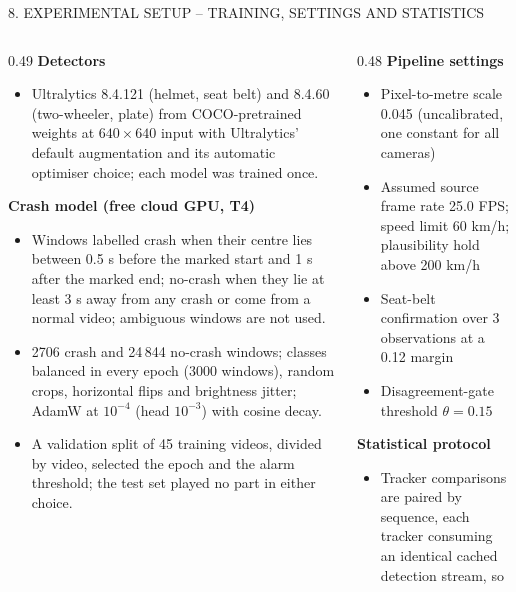 \documentclass[aspectratio=169,10pt,t]{beamer}
\newcommand{\hd}[1]{{\color{dsblue}\textbf{#1}}}          %
\begin{document}
\begin{frame}{8. EXPERIMENTAL SETUP -- TRAINING, SETTINGS AND STATISTICS}
\scriptsize
\begin{columns}[T,onlytextwidth]
\begin{column}{0.49\textwidth}
\hd{\small Detectors}
\begin{itemize}\setlength{\itemsep}{0.15em}
  \item Ultralytics 8.4.121 (helmet, seat belt) and 8.4.60 (two-wheeler, plate) from COCO-pretrained weights at
        $640\times640$ input with Ultralytics' default augmentation and its automatic optimiser choice; each model
        was trained once.
\end{itemize}
\hd{\small Crash model (free cloud GPU, T4)}
\begin{itemize}\setlength{\itemsep}{0.15em}
  \item Windows labelled crash when their centre lies between 0.5 s before the marked start and 1 s after the marked
        end; no-crash when they lie at least 3 s away from any crash or come from a normal video; ambiguous windows are not used.
  \item 2706 crash and 24\,844 no-crash windows; classes balanced in every epoch (3000 windows), random crops,
        horizontal flips and brightness jitter; AdamW at $10^{-4}$ (head $10^{-3}$) with cosine decay.
  \item A validation split of 45 training videos, divided by video, selected the epoch and the alarm threshold; the
        test set played no part in either choice.
\end{itemize}
\end{column}
\begin{column}{0.48\textwidth}
\hd{\small Pipeline settings}
\begin{itemize}\setlength{\itemsep}{0.15em}
  \item Pixel-to-metre scale 0.045 (uncalibrated, one constant for all cameras)
  \item Assumed source frame rate 25.0 FPS; speed limit 60 km/h; plausibility hold above 200 km/h
  \item Seat-belt confirmation over 3 observations at a 0.12 margin
  \item Disagreement-gate threshold $\theta = 0.15$
\end{itemize}
\hd{\small Statistical protocol}
\begin{itemize}\setlength{\itemsep}{0.15em}
  \item Tracker comparisons are paired by sequence, each tracker consuming an identical cached detection stream, so

\end{itemize}
\end{column}
\end{columns}
\end{frame}
\end{document}
